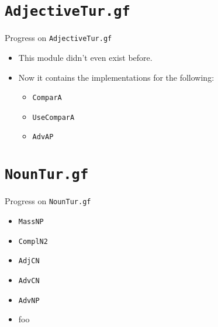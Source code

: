 \documentclass{beamer}
\begin{document}
  \section{\texttt{AdjectiveTur.gf}}

  \begin{frame}{Progress on \texttt{AdjectiveTur.gf}}
    \begin{itemize}
      \item<1-> This module didn't even exist before.
      \item<2-> Now it contains the implementations for the following:
        \begin{itemize}
          \item \texttt{ComparA}
          \item \texttt{UseComparA}
          \item \texttt{AdvAP}
        \end{itemize}
    \end{itemize}
  \end{frame}

  \section{\texttt{NounTur.gf}}

  \begin{frame}{Progress on \texttt{NounTur.gf}}
    \begin{itemize}
      \item \texttt{MassNP}
      \item \texttt{ComplN2}
      \item \texttt{AdjCN}
      \item \texttt{AdvCN}
      \item \texttt{AdvNP}
    \end{itemize}
  \end{frame}

  \begin{frame}
    \begin{itemize}
      \item foo
    \end{itemize}
  \end{frame}

\end{document}
